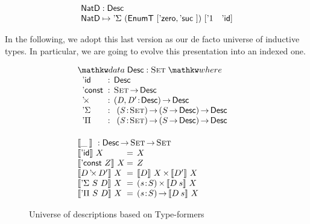 \[\stk{
\NatD : \Desc \\
\NatD \mapsto \DSigma{(\EnumT{[ \NatZero, \NatSuc{} ]})}
                     {[ \DUnit \quad \DId ]}
}\]


In the following, we adopt this last version as our de
facto universe of inductive types. In particular, we are going to
evolve this presentation into an indexed one.


\begin{figure}

\[\stk{
\begin{array}{ll}
\stk{
\data \Desc : \Set \where                                      \\
\;\;\begin{array}{@{}l@{\::\:\:}l@{\quad}l}
    \DId            & \Desc                                    \\
    \DConst{}       & \Set \To \Desc                           \\
    \DProd{}{}      & \PI{\V{D}, \V{D'}}{\Desc} \Desc          \\
    \DSigma         & \PI{\V{S}}{\Set} \PIS{S \To \Desc} \Desc \\
    \DPi            & \PI{\V{S}}{\Set} \PIS{S \To \Desc} \Desc 
\end{array}
}
\vspace{0.2in}
\\
\stk{
\descop{\_\:}{} : \Desc \To \Set \To \Set \\
\begin{array}{@{}l@{\:=\:\:}ll}
\descop{\DId}{X}          &  X                                           \\
\descop{\DConst{Z}}{X}    &  Z                                           \\
\descop{\DProd{D}{D'}}{X} &  \TIMES{\descop{D}{X}}{\descop{D'}{X}}       \\
\descop{\DSigma{S}{D}}{X} &  \SIGMA{\V{s}}{S} \descop{D\: s}{X}          \\
\descop{\DPi{S}{D}}{X}    &  \PI{\V{s}}{S} \descop{D\: s}{X}            
\end{array}
}
\end{array}
}\]

\caption{Universe of descriptions based on Type-formers}
\label{fig:type-former-desc}

\end{figure}


